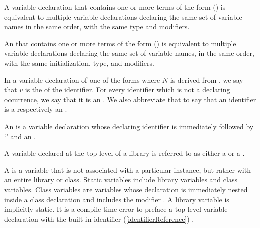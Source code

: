 \documentclass[makeidx]{article}
\begin{document}
\LMHash{}%
A variable declaration that contains one or more terms of the form
()
is equivalent to multiple variable declarations declaring
the same set of variable names in the same order,
with the same type and modifiers.

\LMHash{}%
An  that contains one or more terms of the form
()
is equivalent to multiple variable declarations declaring
the same set of variable names, in the same order,
with the same initialization, type, and modifiers.


\LMHash{}%
In a variable declaration of one of the forms
where $N$ is derived from
,
we say that $v$ is the  of the identifier.
For every identifier which is not a declaring occurrence,
we say that it is an .
We also abbreviate that to say that an identifier is
a  respectively an .


\LMHash{}%
An 
is a variable declaration whose declaring identifier is
immediately followed by `\code{=}' and an .

\LMHash{}%
A variable declared at the top-level of a library is referred to as either a
 or a
.

\LMHash{}%
A 
is a variable that is not associated with a particular instance,
but rather with an entire library or class.
Static variables include library variables and class variables.
Class variables are variables whose declaration is immediately nested inside a class declaration and includes the modifier \STATIC{}.
A library variable is implicitly static.
It is a compile-time error to preface a top-level variable declaration with the built-in identifier (\ref{identifierReference}) \STATIC{}.
\end{document}
